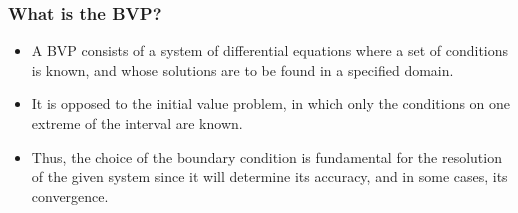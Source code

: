 \documentclass{beamer}
\begin{document}

\begin{frame}
\frametitle{What is the BVP?}
\begin{itemize}
    \item A BVP consists of a system of differential equations where a set of conditions is known, and whose solutions are to be found in a specified domain.
    \item It is opposed to the initial value problem, in which only the conditions on one extreme of the interval are known.
    \item Thus, the choice of the boundary condition is fundamental for the resolution of the given system since it will determine its accuracy, and in some cases, its convergence.
\end{itemize}
\end{frame}
\end{document}
